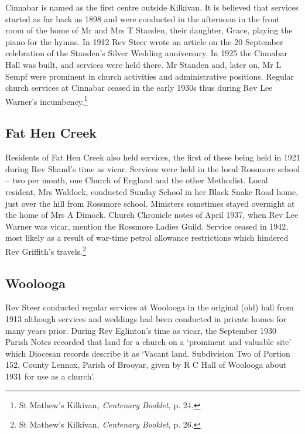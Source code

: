 Cinnabar is named as the first centre outside Kilkivan. It is believed that services started as far back as 1898 and were conducted in the afternoon in the front room of the home of Mr and Mrs T Standen, their daughter, Grace, playing the piano for the hymns. In 1912 Rev Steer wrote an article on the 20 September celebration of the Standen's Silver Wedding anniversary. In 1925 the Cinnabar Hall was built, and services were held there. Mr Standen and, later on, Mr L Sempf were prominent in church activities and administrative positions. Regular church services at Cinnabar ceased in the early 1930s thus during Rev Lee Warner's incumbency.\footnote{St Mathew's Kilkivan\emph{, Centenary Booklet,} p. 24.}

\hypertarget{fat-hen-creek}{%
\subsection{Fat Hen Creek}\label{fat-hen-creek}}

Residents of Fat Hen Creek also held services, the first of these being held in 1921 during Rev Shand's time as vicar. Services were held in the local Rossmore school -- two per month, one Church of England and the other Methodist. Local resident, Mrs Waldock, conducted Sunday School in her Black Snake Road home, just over the hill from Rossmore school. Ministers sometimes stayed overnight at the home of Mrs A Dimock. Church Chronicle notes of April 1937, when Rev Lee Warner was vicar, mention the Rossmore Ladies Guild. Service ceased in 1942, most likely as a result of war-time petrol allowance restrictions which hindered Rev Griffith's travels.\footnote{St Mathew's Kilkivan\emph{, Centenary Booklet,} p. 26.}

\hypertarget{woolooga}{%
\subsection{Woolooga}\label{woolooga}}

Rev Steer conducted regular services at Woolooga in the original (old) hall from 1913 although services and weddings had been conducted in private homes for many years prior. During Rev Eglinton's time as vicar, the September 1930 Parish Notes recorded that land for a church on a `prominent and valuable site' which Diocesan records describe it as `Vacant land. Subdivision Two of Portion 152, County Lennox, Parish of Brooyar, given by R C Hall of Woolooga about 1931 for use as a church'.

